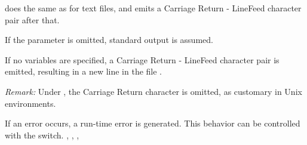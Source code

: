\documentclass{report}
\begin{document}
\procedure{Writeln}{[([Var F : Text;] [V1 [; V2; ... , Vn)]]}
{ does the same as  for text files, and emits a
Carriage Return - LineFeed character pair after that.

If the parameter  is omitted, standard output is assumed. 

If no variables are specified, a Carriage Return - LineFeed character pair
is emitted, resulting in a new line in the file .

{\em Remark:} Under \linux, the Carriage Return character is omitted, as
customary in Unix environments.
}
{If an error occurs, a run-time error is generated. This behavior can be
controlled with the  switch. }
{, , , }



%
% 
\printindex
\end{document}
